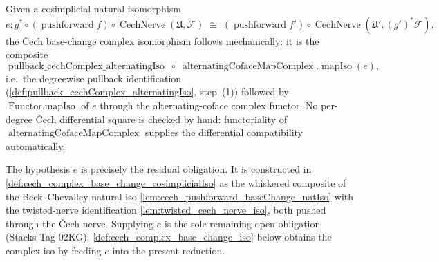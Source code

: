 \begin{definition}\leanok
  \label{def:cech_complex_base_change_iso_of_cosimplicialIso}
  Given a cosimplicial natural isomorphism
  \[
    e : g^* \circ (\operatorname{pushforward} f) \circ
        \operatorname{CechNerve}(\mathfrak{U}, \mathcal{F})
      \;\cong\;
      (\operatorname{pushforward} f') \circ
        \operatorname{CechNerve}(\mathfrak{U}', (g')^*\mathcal{F}),
  \]
  the {\v C}ech base-change complex isomorphism follows mechanically: it is the composite
  \[
    \operatorname{pullback\_cechComplex\_alternatingIso}
    \;\circ\;
    \operatorname{alternatingCofaceMapComplex}.\!\operatorname{mapIso}(e),
  \]
  i.e.\ the degreewise pullback identification
  (\cref{def:pullback_cechComplex_alternatingIso}, step~(1)) followed by
  \(\operatorname{Functor.mapIso}\) of \(e\) through the alternating-coface complex
  functor. No per-degree {\v C}ech differential square is checked by hand:
  functoriality of \(\operatorname{alternatingCofaceMapComplex}\) supplies the
  differential compatibility automatically.

  The hypothesis \(e\) is precisely the residual obligation. It is constructed in
  \cref{def:cech_complex_base_change_cosimplicialIso} as the whiskered composite of the
  Beck--Chevalley natural iso \cref{lem:cech_pushforward_baseChange_natIso} with the
  twisted-nerve identification \cref{lem:twisted_cech_nerve_iso}, both pushed through the
  {\v C}ech nerve. Supplying \(e\) is the sole remaining open obligation (Stacks Tag 02KG);
  \cref{def:cech_complex_base_change_iso} below obtains the complex
  iso by feeding \(e\) into the present reduction.
\end{definition}

